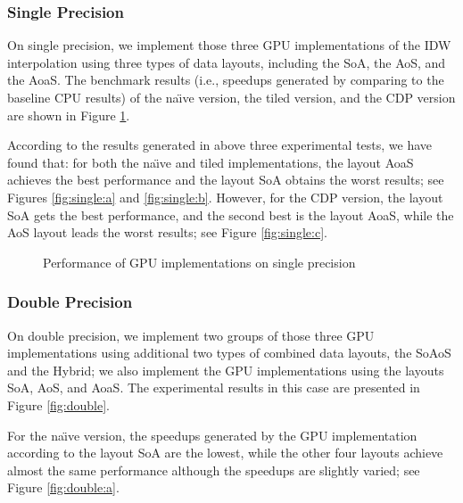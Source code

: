 \subsubsection{Single Precision}
\label{sec:result:single}

On single precision, we implement those three GPU implementations of the IDW 
interpolation using three types of data layouts, including the SoA, the AoS, 
and the AoaS. The benchmark results (i.e., speedups generated 
by comparing to the baseline CPU results) of the na\"{\i}ve version, the 
tiled version, and the CDP version are shown in Figure \ref{fig:single}.

According to the results generated in above three experimental tests, we have found 
that: for both the na\"{\i}ve and tiled implementations, the layout AoaS 
achieves the best performance and the layout SoA obtains the worst results; 
see Figures \ref{fig:single:a} and \ref{fig:single:b}. However, for the CDP version, the layout SoA gets 
the best performance, and the second best is the layout AoaS, while the AoS 
layout leads the worst results; see Figure \ref{fig:single:c}.


\begin{figure}[htb]
\centering
{}
\hspace{1em}
\hspace{1em}
\caption{Performance of GPU implementations on single precision}
\label{fig:single}       \end{figure}


\subsubsection{Double Precision}
\label{sec:result:double}

On double precision, we implement two groups of those three GPU implementations using 
additional two types of combined data layouts, the SoAoS and the Hybrid; we 
also implement the GPU implementations using the layouts SoA, AoS, and AoaS. 
The experimental results in this case are presented in Figure \ref{fig:double}.

For the na\"{\i}ve version, the speedups generated by the GPU implementation 
according to the layout SoA are the lowest, while the other four layouts 
achieve almost the same performance although the speedups are slightly 
varied; see Figure \ref{fig:double:a}.

